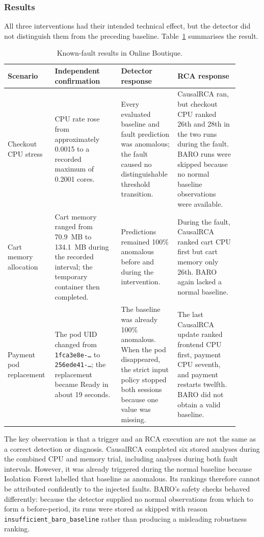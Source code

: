 \subsubsection{Results}

All three interventions had their intended technical effect, but the detector did not distinguish them from the preceding baseline. Table~\ref{tab:h9-known-fault-results} summarises the result.

\begin{table}[H]
    \centering
    \small
    \caption{Known-fault results in Online Boutique.}
    \label{tab:h9-known-fault-results}
    \begin{tabular}{|p{0.18\linewidth}|p{0.27\linewidth}|p{0.20\linewidth}|p{0.25\linewidth}|}
        \hline
        Scenario & Independent confirmation & Detector response & RCA response \\
        \hline
        Checkout CPU stress & CPU rate rose from approximately 0.0015 to a recorded maximum of 0.2001 cores. & Every evaluated baseline and fault prediction was anomalous; the fault caused no distinguishable threshold transition. & CausalRCA ran, but checkout CPU ranked 26th and 28th in the two runs during the fault. BARO runs were skipped because no normal baseline observations were available. \\
        \hline
        Cart memory allocation & Cart memory ranged from 70.9~MB to 134.1~MB during the recorded interval; the temporary container then completed. & Predictions remained 100\% anomalous before and during the intervention. & During the fault, CausalRCA ranked cart CPU first but cart memory only 26th. BARO again lacked a normal baseline. \\
        \hline
        Payment pod replacement & The pod UID changed from \texttt{1fca3e8e-\ldots} to \texttt{256ede41-\ldots}; the replacement became Ready in about 19 seconds. & The baseline was already 100\% anomalous. When the pod disappeared, the strict input policy stopped both sessions because one value was missing. & The last CausalRCA update ranked frontend CPU first, payment CPU seventh, and payment restarts twelfth. BARO did not obtain a valid baseline. \\
        \hline
    \end{tabular}
\end{table}

The key observation is that a trigger and an RCA execution are not the same as a correct detection or diagnosis. CausalRCA completed six stored analyses during the combined CPU and memory trial, including analyses during both fault intervals. However, it was already triggered during the normal baseline because Isolation Forest labelled that baseline as anomalous. Its rankings therefore cannot be attributed confidently to the injected faults. BARO's safety checks behaved differently: because the detector supplied no normal observations from which to form a before-period, its runs were stored as skipped with reason \texttt{insufficient\_baro\_baseline} rather than producing a misleading robustness ranking.

